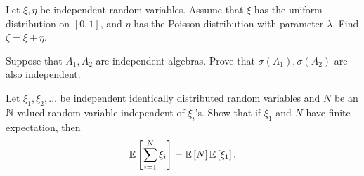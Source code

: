 \begin{problem}{11}
    Let $\xi,\eta$ be independent random variables. Assume that $\xi$ has the uniform distribution on $[0,1]$, and $\eta$ has the Poisson distribution with parameter $\lambda$. Find $\zeta = \xi + \eta$. 
\end{problem}
\begin{solution}

\end{solution}

\begin{problem}{13}
    Suppose that $A_1, A_2$ are independent algebras. Prove that $\sigma(A_1), \sigma(A_2)$ are also independent.
\end{problem}
\begin{solution}
    
\end{solution}

\begin{problem}{14}
Let $\xi_1,\xi_2,\ldots$ be independent identically distributed random variables and $N$ be an $\mathbb{N}$-valued random variable independent of $\xi_i$'s. Show that if $\xi_1$ and $N$ have finite expectation, then \[
    \mathbb{E}\left[\sum_{i=1}^N \xi_i\right] = \mathbb{E}\left[N\right]\mathbb{E}\left[\xi_1\right].
\]
\end{problem}
\begin{solution}
    
\end{solution}